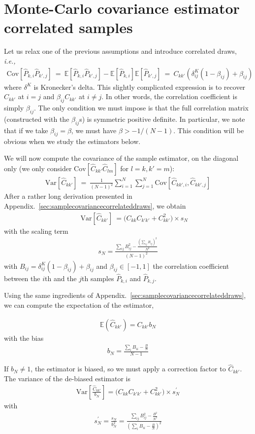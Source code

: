 \documentclass{aastex6}
\newcommand{\ie}{{\textit{i.e.,}~}}
\newcommand{\appref}[1]{{\xspace}Appendix.~\ref{#1}}
\newcommand{\eqn}[1]{\begin{eqnarray}#1\end{eqnarray}}
\begin{document}
\section{Monte-Carlo covariance estimator correlated samples}


Let us relax one of the previous assumptions and introduce correlated draws, \ie
\eqn{
	\mathrm{Cov}[\hat{P}_{k, i}\hat{P}_{k', j}] \ = \ \mathbb{E}[\hat{P}_{k, i}\hat{P}_{k', j}] - \mathbb{E}[\hat{P}_{k, i}]\mathbb{E}[\hat{P}_{k', j}]  \ =  \ C_{kk'} \left( \delta^K_{ij}(1-\beta_{ij}) + \beta_{ij} \right)
}
where $\delta^K$ is Kronecker's delta. This slightly complicated expression is to recover $C_{kk'}$ at $i=j$ and $\beta_{ij}C_{kk'}$ at $i\neq j$. In other words, the correlation coefficient is simply $\beta_{ij}$. The only condition we must impose is that the full correlation matrix (constructed with the $\beta_{ij}$s) is symmetric positive definite. In particular, we note that if we take $\beta_{ij}=\beta$, we must have $\beta > -1/(N-1)$. This condition will be obvious when we study the estimators below.

We will now compute the covariance of the sample estimator, on the diagonal only (we only consider $\mathrm{Cov}[\hat{C}_{kk'}\hat{C}_{lm}]$ for $l=k, k'=m$):
\eqn{
	\mathrm{Var}[\hat{C}_{kk'}] \ =\    \frac{1}{(N-1)^2}\sum_{i=1}^{N}\sum_{j=1}^{N} \mathrm{Cov}[\hat{C}_{kk',i} , \hat{C}_{kk',j} ]
}
After a rather long derivation presented in \appref{sec:samplecovariancecorrelateddraws}, we obtain
\eqn{
	&&  \ \mathrm{Var}[\hat{C}_{kk'}] \ =    \bigl(C_{kk}C_{k'k'} + C_{kk'}^2 \bigr) \times s_N
}
with the scaling term 
\eqn{
	s_N = \frac{ \sum_{ij} B_{ij}^2  - \frac{(\sum_{ij} B_{ij})^2}{N^2}}{(N-1)^2}
}
	 with $B_{ij} =  \delta^K_{ij}(1-\beta_{ij}) + \beta_{ij} $ and $\beta_{ij} \in [-1, 1]$ the correlation coefficient between the $i$th and the $j$th samples $\hat{P}_{k, i}$ and $\hat{P}_{k, j}$. 

Using the same ingredients of \appref{sec:samplecovariancecorrelateddraws}, we can compute the expectation of the estimator,

\eqn{
	\mathbb{E}(\hat{C}_{kk'}) = C_{kk'} b_N
}
with the bias
\eqn{
	b_N = \frac{\sum_i B_{ii} - \frac{B}{N}}{N-1}
}

If $b_N\neq 1$, the estimator is biased, so we must apply a correction factor to $\hat{C}_{kk'}$.
The variance of the de-biased estimator is
\eqn{
	 \mathrm{Var}\left[ \frac{\hat{C}_{kk'}}{b_N}\right]  = \bigl(C_{kk}C_{k'k'} + C_{kk'}^2 \bigr) \times s_N^\prime  \label{ref:samplecovariancevariance}
}
with 
\eqn{
	s_N^\prime  = \frac{s_N}{b^2_N} =  \frac{ \sum_{ij} B_{ij}^2  - \frac{B^2}{N^2}}{ \left(\sum_i B_{ii} - \frac{B}{N}\right)^2 }
	}
\end{document}
